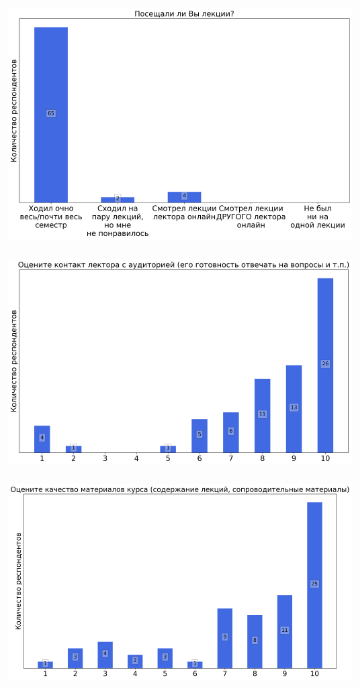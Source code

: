 		\begin{figure}[H]
			\centering
            \begin{subfigure}[b]{0.45\textwidth}
				\centering
				\includegraphics[width=\textwidth]{images/3 course/Компьютерные сети/lecturer-questions-Климанов М.М.-0.png}
			\end{subfigure}
			\begin{subfigure}[b]{0.45\textwidth}
				\centering
				\includegraphics[width=\textwidth]{images/3 course/Компьютерные сети/lecturer-marks-Климанов М.М.-0.png}
			\end{subfigure}
			\begin{subfigure}[b]{0.45\textwidth}
				\centering
				\includegraphics[width=\textwidth]{images/3 course/Компьютерные сети/lecturer-marks-Климанов М.М.-1.png}

\end{subfigure}
\end{figure}
